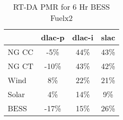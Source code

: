 \begin{table}[htbp]
\centering
\begin{tabular}{lccc}
\toprule
\hline
 & dlac-p & dlac-i & slac \\
\hline
\quad NG CC & -5\% & 44\% & 43\% \\
\quad NG CT & -10\% & 43\% & 42\% \\
\quad Wind & 8\% & 22\% & 21\% \\
\quad Solar & 4\% & 14\% & 9\% \\
\quad BESS & -17\% & 15\% & 26\% \\
\hline
\bottomrule
\end{tabular}
\caption{RT-DA PMR for 6 Hr BESS Fuelx2}
\label{tab:table4_6_Hr_BESS_Fuelx2}
\end{table}
